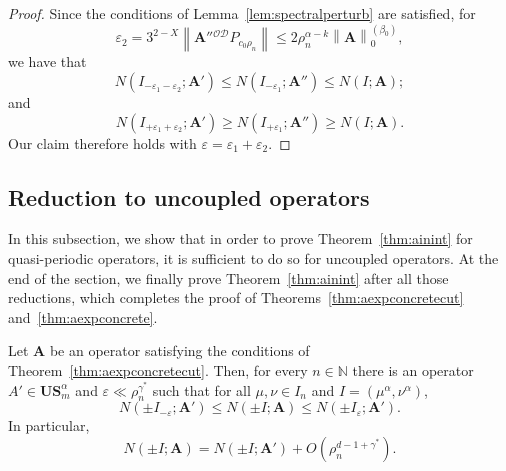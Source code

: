 \documentclass[AHL,Unicode,longabstracts,published]{cedram}
\newcommand{\N}{\mathbb N}
\newcommand{\CD}{\mathcal{D}}
\newcommand{\CO}{\mathcal{O}}
\newcommand{\BA}{\mathbf A}
\newcommand{\BS}{\mathbf S}
\newcommand{\BU}{\mathbf U}
\newcommand{\eps}{\varepsilon}
\newcommand{\bigo}[1]{O\left(#1 \right)}
\newcommand{\norm}[1]{\left\| #1 \right\|}
\newcommand{\snorm}[3]{\left\| #1\right\|_{#3}^{(#2)}}
\begin{document}
\begin{proof}
Since the conditions of Lemma~\ref{lem:spectralperturb} are satisfied, for
\begin{equation}
\eps_2 = 3^{2 - X} \norm{\BA''{}^{\CO\CD}P_{c_0\rho_n}} \le 2\rho_n^{\alpha - k} \snorm{\BA}{\beta_0}{0},
\end{equation}
we have that
\begin{equation}
N\left(I_{- \eps_1 - \eps_2}; \BA' \right) \le N(I_{-\eps_1};\BA'') \le N(I;\BA);
\end{equation}
and
\begin{equation}
N(I_{+ \eps_1 + \eps_2};\BA') \ge N(I_{+\eps_1};\BA'') \ge N(I;\BA).
\end{equation}
Our claim therefore holds with $\eps = \eps_1 + \eps_2$.
\end{proof}



\subsection{Reduction to uncoupled operators} \label{sec:redtouncoupled}
In this subsection, we show that in order to prove Theorem~\ref{thm:ainint} for quasi-periodic operators, it is sufficient to do so for uncoupled operators. At the end of the section, we finally prove Theorem~\ref{thm:ainint} after all those reductions, which completes the proof of Theorems~\ref{thm:aexpconcretecut} and~\ref{thm:aexpconcrete}.

\begin{theo}\label{thm:ctoucut}
Let $\BA$ be an operator satisfying the conditions of Theorem~\ref{thm:aexpconcretecut}. Then, for every $n \in \N$ there is an operator $A' \in \BU\BS^\alpha_m$ and $\eps \ll
\rho_n^{\gamma^*}$ such that for all $\mu,\nu \in I_n$ and $I = (\mu^\alpha,
\nu^\alpha)$,
\begin{equation}\label{eq:errorestinterval}
N(\pm I_{- \eps}; \BA') \le N(\pm I;\BA) \le N(\pm I_\eps;\BA').
\end{equation}
In particular,
\begin{equation}\label{eq:errorest}
N(\pm I;\BA) = N(\pm I;\BA') + \bigo{\rho_n^{d - 1 + \gamma^*}}.
\end{equation}
\end{theo}
\end{document}
